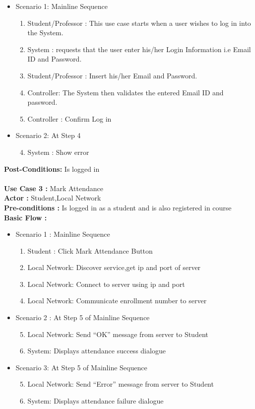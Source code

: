 \documentclass{article}
\begin{document}
\begin{itemize}
    \item Scenario 1: Mainline Sequence
\begin{enumerate}
\item Student/Professor : This use case starts when a user wishes to log in into the System. 
\item System : requests that the user enter his/her Login Information i.e Email ID and Password. 
\item Student/Professor : Insert his/her Email and Password. 	
\item Controller: The System then validates the entered Email ID and password.
\item Controller : Confirm Log in
\end{enumerate}
	\item Scenario 2: At Step 4
	    \begin{enumerate}
	        \setcounter{enumi}{3}
		    \item System : Show error
	    \end{enumerate}
		
\end{itemize}
\textbf{Post-Conditions:} Is logged in\\ \\
\textbf{Use Case 3 :} Mark Attendance \\
\textbf{Actor :} Student,Local Network\\
\textbf{Pre-conditions :}  Is logged in as a student and is also registered in course\\
\textbf{Basic Flow :}
\begin{itemize}
    \item Scenario 1 : Mainline Sequence
        \begin{enumerate}
            \item Student : Click Mark Attendance Button
	\item Local Network: Discover service,get ip and port of server
	\item Local Network: Connect to server using ip and port
	\item Local Network: Communicate enrollment number to server
        \end{enumerate}
   \item Scenario 2 : At Step 5 of Mainline Sequence
        \begin{enumerate}
	\setcounter{enumi}{4}
            \item Local Network: Send “OK” message from server to Student
	\item System: Displays attendance success dialogue
        \end{enumerate}
 \item Scenario 3: At Step 5 of Mainline Sequence
       \begin{enumerate}
	\setcounter{enumi}{4}
	\item Local Network: Send “Error” message from server to Student
	\item System: Displays attendance failure dialogue
     \end{enumerate}
\end{itemize}
\end{document}

